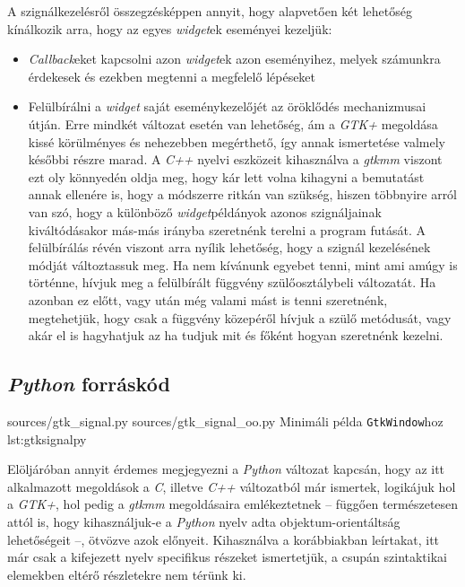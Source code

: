 A szignálkezelésről összegzésképpen annyit, hogy alapvetően két lehetőség kínálkozik arra, hogy az egyes \textit{widget}ek eseményei kezeljük:

\begin{itemize}
 \item \textit{Callback}eket kapcsolni azon \textit{widget}ek azon eseményihez, melyek számunkra érdekesek és ezekben megtenni a megfelelő lépéseket

 \item Felülbírálni a \textit{widget} saját eseménykezelőjét az öröklődés mechanizmusai útján. Erre mindkét változat esetén van lehetőség, ám a \textit{GTK+} megoldása kissé körülményes és nehezebben megérthető, így annak ismertetése valmely későbbi részre marad. A \textit{C++} nyelvi eszközeit kihasználva a \textit{gtkmm} viszont ezt oly könnyedén oldja meg, hogy kár lett volna kihagyni a bemutatást annak ellenére is, hogy a módszerre ritkán van szükség, hiszen többnyire arról van szó, hogy a különböző \textit{widget}példányok azonos szignáljainak kiváltódásakor más-más irányba szeretnénk terelni a program futását. A felülbírálás révén viszont arra nyílik lehetőség, hogy a szignál kezelésének módját változtassuk meg. Ha nem kívánunk egyebet tenni, mint ami amúgy is történne, hívjuk meg a felülbírált függvény szülőosztálybeli változatát. Ha azonban  ez előtt, vagy után még valami mást is tenni szeretnénk, megtehetjük, hogy csak a függvény közepéről hívjuk a szülő metódusát, vagy akár el is hagyhatjuk az ha tudjuk mit és főként hogyan szeretnénk kezelni.
\end{itemize}

\subsection{\textit{Python} forráskód}

\lstdoublepysource
{sources/gtk_signal.py}
{sources/gtk_signal_oo.py}
{Minimáli példa \texttt{GtkWindow}hoz}
{lst:gtksignalpy}


Elöljáróban annyit érdemes megjegyezni a \textit{Python} változat kapcsán, hogy az itt alkalmazott megoldások a \textit{C}, illetve \textit{C++} változatból már ismertek, logikájuk hol a \textit{GTK+}, hol pedig a \textit{gtkmm} megoldásaira emlékeztetnek -- függően természetesen attól is, hogy kihasználjuk-e a \textit{Python} nyelv adta objektum-orientáltság lehetőségeit --, ötvözve azok előnyeit. Kihasználva a korábbiakban leírtakat, itt már csak a kifejezett nyelv specifikus részeket ismertetjük, a csupán szintaktikai elemekben eltérő részletekre nem térünk ki.

